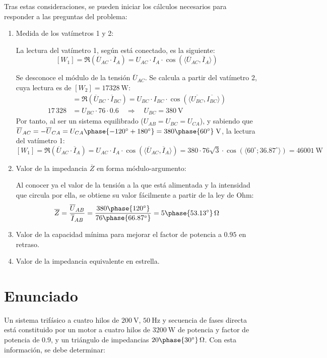 Tras estas consideraciones, se pueden iniciar los cálculos necesarios
para responder a las preguntas del problema:
\begin{enumerate}
\item Medida de los vatímetros 1 y 2:
    
  La lectura del vatímetro 1, según está conectado, es la siguiente:
  \[ [W_1]=\Re(\overline{U}_{AC}\cdot \overline{I} _A)=U_{AC}\cdot I_A\cdot
    \cos(\langle \overline{U}_{AC}, \overline{I}_A \rangle)
  \]

  Se desconoce el módulo de la tensión $\overline{U}_{AC}$. Se calcula
  a partir del vatímetro 2, cuya lectura es de
  $[W_2]=\qty{17328}{\watt}$:
  \begin{align*}
 [W_2] &=\Re(\overline{U}_{BC} \cdot \overline{I}_{BC})=U_{BC}\cdot
    I_{BC}\cdot \cos(\langle \overline{U_{BC}},
         \overline{I_{BC}}\rangle)\\[3pt]
    17\,328&=U_{BC}\cdot 76\cdot
    0.6 \quad\Rightarrow\quad U_{BC}=\qty{380}{\volt}
  \end{align*}
  Por tanto, al ser un sistema equilibrado ($U_{AB}=U_{BC}=U_{CA}$), y
  sabiendo que
  $\overline{U}_{AC}=-\overline{U}_{CA}=U_{CA}\phase{-120^\circ+180^\circ}=380\phase{\ang{60}}\;\si{\volt}$,
  la lectura del vatímetro 1:
  \[ [W_1]=\Re(\overline{U}_{AC}\cdot \overline{I}_A)=U_{AC}\cdot I_A\cdot
    \cos(\langle \overline{U}_{AC}, \overline{I}_A \rangle)=380\cdot
    76\sqrt{3}\cdot \cos(\langle60^\circ;36.87^\circ\rangle)=\qty{46001}{\watt}
  \]

\item Valor de la impedancia $\overline{Z}$ en forma módulo-argumento:

  Al conocer ya el valor de la tensión a la que está alimentada y la
  intensidad que circula por ella, se obtiene su valor fácilmente a
  partir de la ley de Ohm:
  \[
    \overline{Z}=\dfrac{\overline{U}_{AB}}{\overline{I}_{AB}}=\dfrac{380\phase{120^\circ}}{76\phase{66.87^\circ}}={5\phase{\ang{53.13}}}\,\unit{\ohm}
  \]

\item Valor de la capacidad mínima para mejorar el factor de potencia
  a $0.95$ en retraso.




\item Valor de la impedancia equivalente en estrella.


\end{enumerate}

\section{Enunciado}
Un sistema trifásico a cuatro hilos de $\qty{200}{\volt}$, $\qty{50}{\hertz}$ y secuencia de fases directa está constituido por un motor a cuatro hilos de $\qty{3200}{\watt}$ de potencia y factor de potencia de $0.9$, y un triángulo de impedancias $20\phase{\ang{30}}\,\unit{\ohm}$. Con esta información, se debe determinar:

